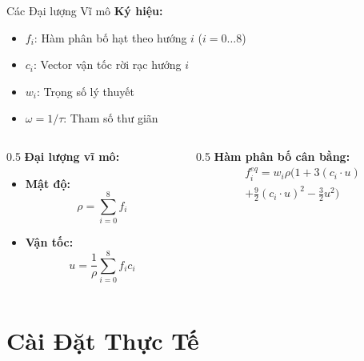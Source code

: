 \documentclass[t, aspectratio=169]{beamer}
\begin{document}
	\begin{frame}{Các Đại lượng Vĩ mô}
		\textbf{Ký hiệu:}
		\begin{itemize}
			\item $f_i$: Hàm phân bố hạt theo hướng $i$ ($i=0 \dots 8$)
			\item $c_i$: Vector vận tốc rời rạc hướng $i$
			\item $w_i$: Trọng số lý thuyết
			\item $\omega = 1/\tau$: Tham số thư giãn
		\end{itemize}
		
		\vspace{1em}
		
		\begin{columns}[T]
			\begin{column}{0.5\textwidth}
				\textbf{Đại lượng vĩ mô:}
				\begin{itemize}
					\item \textbf{Mật độ:} 
					\[\rho = \sum_{i=0}^{8} f_i\]
					\item \textbf{Vận tốc:} 
					\[u = \frac{1}{\rho} \sum_{i=0}^{8} f_i c_i\]
				\end{itemize}
			\end{column}
			
			\begin{column}{0.5\textwidth}
				\textbf{Hàm phân bố cân bằng:}
				\begin{equation}
					\begin{split}
						f_i^{eq} = w_i \rho \Big(1 + 3(c_i \cdot u) \\
						+ \frac{9}{2}(c_i \cdot u)^2 - \frac{3}{2}u^2\Big)
					\end{split}
				\end{equation}
			\end{column}
		\end{columns}
	\end{frame}
	
	\useStyleLogoOnly
	\useThickBar
	
	\section{Cài Đặt Thực Tế}
	
\end{document}

